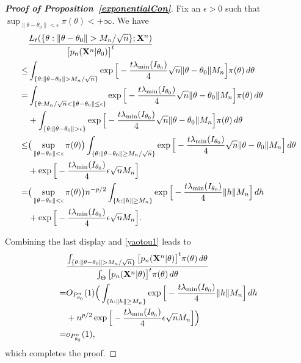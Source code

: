 \documentclass[11pt]{article}
\theoremstyle{plain}
\theoremstyle{definition}
\theoremstyle{remark}
\begin{document}
\begin{appendices}
\begin{proof}[\textbf{Proof of Proposition~\ref{exponentialCon}}]
    Fix an $\epsilon>0$ such that $\sup_{\|\theta-\theta_0\|< \epsilon}\pi(\theta) < +\infty $. We have
$$
    \begin{aligned}
        &
    \frac{L_t({\{\theta:\|\theta-\theta_0\|> M_n/\sqrt{n}\}};\BX^{n})}{
        \big[p_n(\BX^{n}|\theta_0)\big]^t 
    }
        \\
        \leq&
        \int_{\{\theta:\|\theta-\theta_0\|> M_n/\sqrt{n}\}} 
        \exp\Big[-\frac{t\lambda_{\min}(I_{\theta_0})}{4}\sqrt{n}\|\theta-\theta_0\|M_n\Big]
        \pi(\theta)\, d\theta
        \\
        =&
        \int_{\{\theta:M_n/\sqrt{n}< \|\theta-\theta_0\|\leq \epsilon \}} 
        \exp\Big[-\frac{t\lambda_{\min}(I_{\theta_0})}{4}\sqrt{n}\|\theta-\theta_0\|M_n\Big]
        \pi(\theta)\, d\theta
        \\
        &+
        \int_{\{\theta:\|\theta-\theta_0\|> \epsilon\}} 
        \exp\Big[-\frac{t\lambda_{\min}(I_{\theta_0})}{4}\sqrt{n}\|\theta-\theta_0\|M_n\Big]
        \pi(\theta)\, d\theta
        \\
        \leq& 
        \big(\sup_{\|\theta-\theta_0\|<\epsilon}\pi(\theta)\big)
        \int_{\{\theta: \|\theta-\theta_0\|\geq M_n/\sqrt{n}\}} 
        \exp\Big[-\frac{t\lambda_{\min}(I_{\theta_0})}{4}\sqrt{n}\|\theta-\theta_0\|M_n\Big]
        \, d\theta
        \\
        &+
        \exp\Big[-\frac{t\lambda_{\min}(I_{\theta_0})}{4}\epsilon\sqrt{n}M_n\Big]
        \\
        =& 
        \big(\sup_{\|\theta-\theta_0\|<\epsilon}\pi(\theta)\big)
        n^{-p/2}
        \int_{\{h: \|h\|\geq M_n\}} 
        \exp\Big[-\frac{t\lambda_{\min}(I_{\theta_0})}{4}\|h\| M_n\Big]
        \, dh
        \\
        &+
        \exp\Big[-\frac{t\lambda_{\min}(I_{\theta_0})}{4}\epsilon\sqrt{n}M_n\Big]
        .
    \end{aligned}
$$

Combining the last display and \eqref{yaotou1} leads to
$$
    \begin{aligned}
        &\frac{
            \int_{\{\theta:\|\theta-\theta_0\|> M_n/\sqrt{n}\}} \big[p_n(\BX^{n}|\theta)\big]^t \pi(\theta)\, d\theta
        }
        {
            \int_{\Theta} \big[p_n(\BX^{n}|\theta)\big]^t \pi(\theta)\, d\theta
        }
        \\
        =&
        O_{P_{\theta_0}^n}(1)
        \Big(
        \int_{\{h: \|h\|\geq M_n\}} 
        \exp\Big[-\frac{t\lambda_{\min}(I_{\theta_0})}{4}\|h\| M_n\Big]
        \, dh
        \\
        &+
        n^{p/2}\exp\Big[-\frac{t\lambda_{\min}(I_{\theta_0})}{4}\epsilon\sqrt{n}M_n\Big]
        \Big)
        \\
        =&o_{P^n_{\theta_0}}(1),
    \end{aligned}
$$
which completes the proof.


\end{proof}
\end{appendices}
\end{document}

